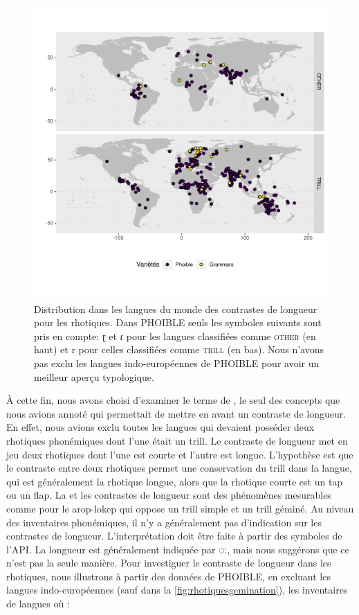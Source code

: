 \begin{figure}
	\centering
	\includegraphics[width=1\linewidth,
	trim={0 1.65cm 0 1.65cm}, clip]{substance/images/rhotiques_gemination}
	\caption[Distribution dans les langues du monde des contrastes de longueur pour les rhotiques]{Distribution dans les langues du monde des contrastes de longueur pour les rhotiques. Dans PHOIBLE seuls les symboles suivants sont pris en compte: ɽ et ɾ pour les langues classifiées comme \textsc{other} (en haut) et r pour celles classifiées comme \textsc{trill} (en bas). Nous n'avons pas exclu les langues indo-européennes de PHOIBLE pour avoir un meilleur aperçu typologique.}
	\label{fig:rhotiquesgemination}
\end{figure}


À cette fin, nous avons choisi d'examiner le terme de , le seul des concepts que nous avions annoté qui permettait de mettre en avant un contraste de longueur. En effet, nous avions exclu toutes les langues qui devaient posséder deux rhotiques phonémiques dont l'une était un trill. Le contraste de longueur met en jeu deux rhotiques dont l'une est courte et l'autre est longue. L'hypothèse est que le contraste entre deux rhotiques permet une conservation du trill dans la langue, qui est généralement la rhotique longue, alors que la rhotique courte est un tap ou un flap.
La  et les contrastes de longueur sont des phénomènes mesurables comme pour le arop-lokep  qui oppose un trill simple et un trill géminé.
Au niveau des inventaires phonémiques, il n'y a généralement pas d'indication sur les contrastes de longueur. L'interprétation doit être faite à partir des symboles de l'API. La longueur est généralement indiquée par {◌ː}, mais nous suggérons que ce n'est pas la seule manière.
Pour investiguer le contraste de longueur dans les rhotiques, nous illustrons à partir des données de PHOIBLE, en excluant les langues indo-européennes (sauf dans la \autoref{fig:rhotiquesgemination}), les inventaires de langues où :

